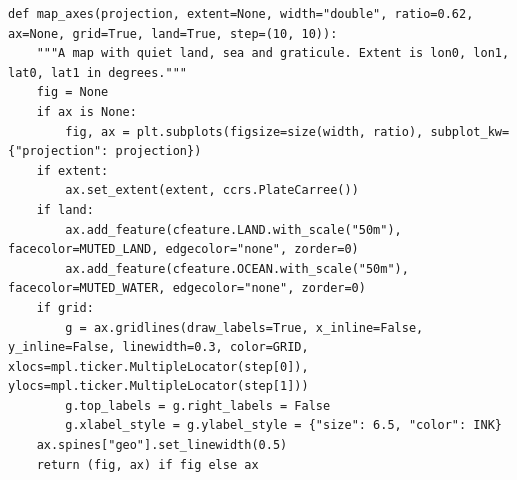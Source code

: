 \begin{lstlisting}[firstnumber=56]
def map_axes(projection, extent=None, width="double", ratio=0.62, ax=None, grid=True, land=True, step=(10, 10)):
    """A map with quiet land, sea and graticule. Extent is lon0, lon1, lat0, lat1 in degrees."""
    fig = None
    if ax is None:
        fig, ax = plt.subplots(figsize=size(width, ratio), subplot_kw={"projection": projection})
    if extent:
        ax.set_extent(extent, ccrs.PlateCarree())
    if land:
        ax.add_feature(cfeature.LAND.with_scale("50m"), facecolor=MUTED_LAND, edgecolor="none", zorder=0)
        ax.add_feature(cfeature.OCEAN.with_scale("50m"), facecolor=MUTED_WATER, edgecolor="none", zorder=0)
    if grid:
        g = ax.gridlines(draw_labels=True, x_inline=False, y_inline=False, linewidth=0.3, color=GRID, xlocs=mpl.ticker.MultipleLocator(step[0]), ylocs=mpl.ticker.MultipleLocator(step[1]))
        g.top_labels = g.right_labels = False
        g.xlabel_style = g.ylabel_style = {"size": 6.5, "color": INK}
    ax.spines["geo"].set_linewidth(0.5)
    return (fig, ax) if fig else ax
\end{lstlisting}
